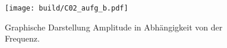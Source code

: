 \begin{figure}
    \centering
    \texttt{[image: build/C02\_aufg\_b.pdf]}
    \caption{Graphische Darstellung Amplitude in Abhängigkeit von der Frequenz.}
    \label{fig:b_plot}
\end{figure}